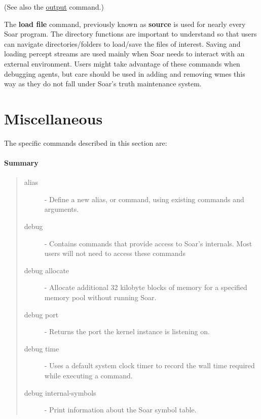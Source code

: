(See also the \href{output}{output} command.)

The \textbf{load file} command, previously known as \textbf{source} is used for nearly every Soar program.  The
directory functions are important to understand so that users can
navigate directories/folders to load/save the files of interest.  
Saving and loading percept streams are used mainly  when Soar needs to interact with an
external environment.  Users might take advantage of these commands when
debugging agents, but care should be used in adding and removing wmes this
way as they do not fall under Soar's truth maintenance system.

\divider 

\divider 

\divider 

\divider 

\section{Miscellaneous}
\label{MISC}



The specific commands described in this section are:


\paragraph{Summary}
\begin{quote}
\begin{description}
\item[alias] - Define a new alias, or command, using existing commands and arguments.
\item[debug] - Contains commands that provide access to Soar's internals. Most users will not need to access these commands
\item[debug allocate] - Allocate additional 32 kilobyte blocks of memory for a specified memory pool without running Soar.
\item[debug port] - Returns the port the kernel instance is listening on.
\item[debug time] - Uses a default system clock timer to record the wall time required while executing a command.
\item[debug internal-symbols] - Print information about the Soar symbol table.
\end{description}
\end{quote}

\divider 

\divider 

